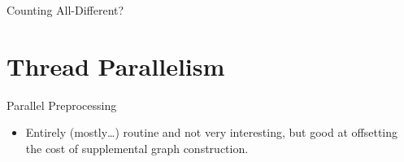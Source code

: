 \documentclass{beamer}
\begin{document}
\begin{frame}{Counting All-Different?}
    \only<1>{
        
    }
    \only<2>{
        
    }
\end{frame}

\section{Thread Parallelism}
\frame{\sectionpage}

\begin{frame}{Parallel Preprocessing}
    \begin{itemize}
        \item Entirely (mostly\ldots) routine and not very interesting, but good at offsetting the
            cost of supplemental graph construction.
    \end{itemize}
\end{frame}
\end{document}
